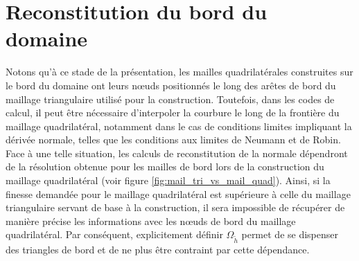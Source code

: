 \section{Reconstitution du bord du domaine}
Notons qu'à ce stade de la présentation, les mailles quadrilatérales construites sur le bord du domaine ont leurs nœuds positionnés le long des arêtes de bord du maillage triangulaire utilisé pour la construction. Toutefois, dans les codes de calcul, il peut être nécessaire d'interpoler la courbure le long de la frontière du maillage quadrilatéral, notamment dans le cas de conditions limites impliquant la dérivée normale, telles que les conditions aux limites de Neumann et de Robin. Face à une telle situation, les calculs de reconstitution de la normale dépendront de la résolution obtenue pour les mailles de bord lors de la construction du maillage quadrilatéral (voir figure \ref{fig:mail_tri_vs_mail_quad}). Ainsi, si la finesse demandée pour le maillage quadrilatéral est supérieure à celle du maillage triangulaire servant de base à la construction, il sera impossible de récupérer de manière précise les informations avec les nœuds de bord du maillage quadrilatéral. Par conséquent, explicitement définir $\Omega_{\tilde{h}}$ permet de se dispenser des triangles de bord et de ne plus être contraint par cette dépendance.\\\\
